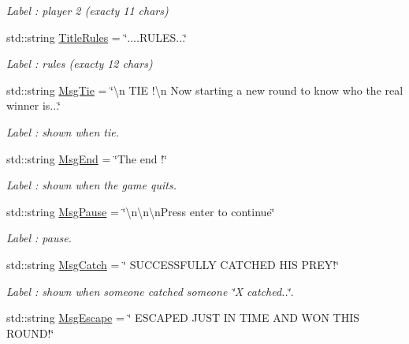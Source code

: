 \begin{DoxyCompactItemize}
\begin{DoxyCompactList}\small\item\em Label \-: player 2 (exacty 11 chars) \end{DoxyCompactList}\item 
std\-::string \hyperlink{struct_chase_game_1_1_s_lang_strings_a80834f6e732fff6fae2ea0f2e341c7bd}{Title\-Rules} = \char`\"{}....R\-U\-L\-E\-S...\char`\"{}
\begin{DoxyCompactList}\small\item\em Label \-: rules (exacty 12 chars) \end{DoxyCompactList}\item 
std\-::string \hyperlink{struct_chase_game_1_1_s_lang_strings_aedfc3595110c1d1da944d4ca35fc1510}{Msg\-Tie} = \char`\"{}\textbackslash{}n T\-I\-E !\textbackslash{}n Now starting a new round to know who the real winner is...\char`\"{}
\begin{DoxyCompactList}\small\item\em Label \-: shown when tie. \end{DoxyCompactList}\item 
std\-::string \hyperlink{struct_chase_game_1_1_s_lang_strings_a257add6b60a691261480e9b1739564e1}{Msg\-End} = \char`\"{}The end !\char`\"{}
\begin{DoxyCompactList}\small\item\em Label \-: shown when the game quits. \end{DoxyCompactList}\item 
std\-::string \hyperlink{struct_chase_game_1_1_s_lang_strings_ad8e029116bf5c6ad81dd7e116195d5cc}{Msg\-Pause} = \char`\"{}\textbackslash{}n\textbackslash{}n\textbackslash{}n\-Press enter to continue\char`\"{}
\begin{DoxyCompactList}\small\item\em Label \-: pause. \end{DoxyCompactList}\item 
std\-::string \hyperlink{struct_chase_game_1_1_s_lang_strings_a5d6864e670cfe0b90ad02635a38035f4}{Msg\-Catch} = \char`\"{} S\-U\-C\-C\-E\-S\-S\-F\-U\-L\-L\-Y C\-A\-T\-C\-H\-E\-D H\-I\-S P\-R\-E\-Y!\char`\"{}
\begin{DoxyCompactList}\small\item\em Label \-: shown when someone catched someone \char`\"{}\-X catched..\char`\"{}. \end{DoxyCompactList}\item 
std\-::string \hyperlink{struct_chase_game_1_1_s_lang_strings_ac77a3cbdbd63a66e69754666ee88cd78}{Msg\-Escape} = \char`\"{} E\-S\-C\-A\-P\-E\-D J\-U\-S\-T I\-N T\-I\-M\-E A\-N\-D W\-O\-N T\-H\-I\-S R\-O\-U\-N\-D!\char`\"{}

\end{DoxyCompactItemize}
